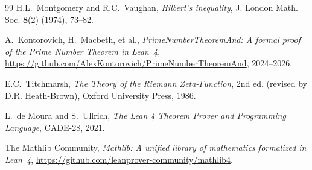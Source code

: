 \documentclass[11pt,a4paper]{article}
\begin{document}
\begin{thebibliography}{99}
H.L.~Montgomery and R.C.~Vaughan, \emph{Hilbert's inequality},
J. London Math. Soc. \textbf{8}(2) (1974), 73--82.

A.~Kontorovich, H.~Macbeth, et al., \emph{PrimeNumberTheoremAnd:
A formal proof of the Prime Number Theorem in Lean~4},
\url{https://github.com/AlexKontorovich/PrimeNumberTheoremAnd}, 2024--2026.

E.C.~Titchmarsh, \emph{The Theory of the Riemann Zeta-Function},
2nd ed. (revised by D.R. Heath-Brown), Oxford University Press, 1986.

L.~de Moura and S.~Ullrich, \emph{The Lean 4 Theorem Prover and
Programming Language}, CADE-28, 2021.

The Mathlib Community, \emph{Mathlib: A unified library of mathematics
formalized in Lean~4}, \url{https://github.com/leanprover-community/mathlib4}.

\end{thebibliography}
\end{document}
